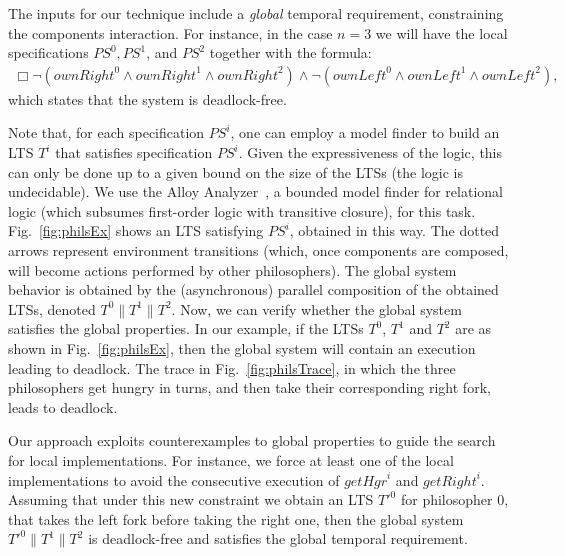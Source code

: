 The inputs for our technique include a \emph{global} temporal requirement, constraining the components interaction.  For instance,  in the case  $n=3$ we will have the local specifications $\mathit{PS}^0, \mathit{PS}^1$, and $\mathit{PS}^2$ together with the  {\LTL}  formula:
\begin{multline*}
   \Box \neg (\mathit{ownRight}^0 \wedge \mathit{ownRight}^1 \wedge \mathit{ownRight}^2) 
   \wedge \neg (\mathit{ownLeft}^0 \wedge \mathit{ownLeft}^1 \wedge \mathit{ownLeft}^2),
\end{multline*}
which states that  the system is deadlock-free.  

Note that, for each specification $\mathit{PS}^i$, one can employ a model finder to build an LTS $T^i$ that satisfies specification $\mathit{PS}^i$. Given the expressiveness of the logic, this can only be done up to a given bound on the size of the LTSs (the logic is undecidable). We use the Alloy Analyzer~\cite{AlloyBook}, a bounded model finder for relational logic (which subsumes first-order logic with transitive closure), for this task. Fig.~\ref{fig:philsEx} shows an LTS satisfying $\mathit{PS}^i$, obtained in this way. The dotted arrows represent environment transitions (which, once components are composed, will become actions performed by other philosophers). The global system behavior is obtained by the (asynchronous) parallel composition of the obtained LTSs, denoted  $T^0 \parallel T^1 \parallel T^2$. Now, we can verify whether the global system satisfies the global properties. In our example, if the LTSs $T^0$, $T^1$ and $T^2$ are as shown in Fig.~\ref{fig:philsEx}, then the global system will contain an execution leading to deadlock. 
The trace in Fig.~\ref{fig:philsTrace}, in which the three philosophers get hungry in turns, and then take their corresponding right fork, leads to deadlock. %

Our approach exploits counterexamples to global properties to guide the search for local implementations.  For instance,  we force at least one of the local implementations to avoid the consecutive execution of $\textit{getHgr}^i$ and $\mathit{getRight}^i$. Assuming that under this new constraint we obtain an LTS $T'^{0}$ for philosopher $0$, that takes the left fork before taking the right one, then the global system $T'^{0} \parallel T^1 \parallel T^2$ is deadlock-free and satisfies the global temporal requirement.


